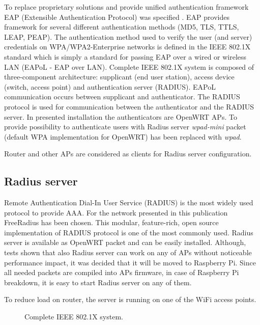 \documentclass{llncs}
\begin{document}
To replace proprietary solutions and provide unified authentication framework EAP (Extensible Authentication Protocol) was specified \cite{rfc3748}. EAP provides framework for several different authentication methods (MD5, TLS, TTLS, LEAP, PEAP). The authentication method used to verify the user (and server) credentials on WPA/WPA2-Enterprise networks is defined in the IEEE 802.1X standard which is simply a standard for passing EAP over a wired or wireless LAN (EAPoL - EAP over LAN). Complete IEEE 802.1X system is composed of three-component architecture: supplicant (end user station), access device (switch, access point) and authentication server (RADIUS).  EAPoL communication occurs between supplicant and authenticator. The RADIUS protocol is used for communication between the authenticator and the RADIUS server. In presented installation the authenticators are OpenWRT APs. To provide possibility to authenticate users with Radius server \textit{wpad-mini} packet (default WPA implementation for OpenWRT) has been replaced with \textit{wpad}. 


Router and other APs are considered as clients for Radius server configuration. 


\subsection{Radius server}

Remote Authentication Dial-In User Service (RADIUS) \cite{rfc2865} is the most widely used protocol to provide AAA. For the network presented in this publication FreeRadius \cite{freeRadius} has been chosen. This modular, feature-rich, open source implementation of RADIUS protocol is one of the most commonly used. Radius server is available as OpenWRT packet and can be easily installed. Although, tests shown that also Radius server can work on any of APs without noticeable performance impact, it was decided that it will be moved to Raspberry Pi. Since all needed packets are compiled into APs firmware, in case of Raspberry Pi breakdown, it is easy to start Radius server on any of them. 



To reduce load on router, the server is running on one of the WiFi access points. 

 



\begin{figure}
	\vspace{-15pt}
	\caption{Complete IEEE 802.1X system.}
\end{figure}
\end{document}
